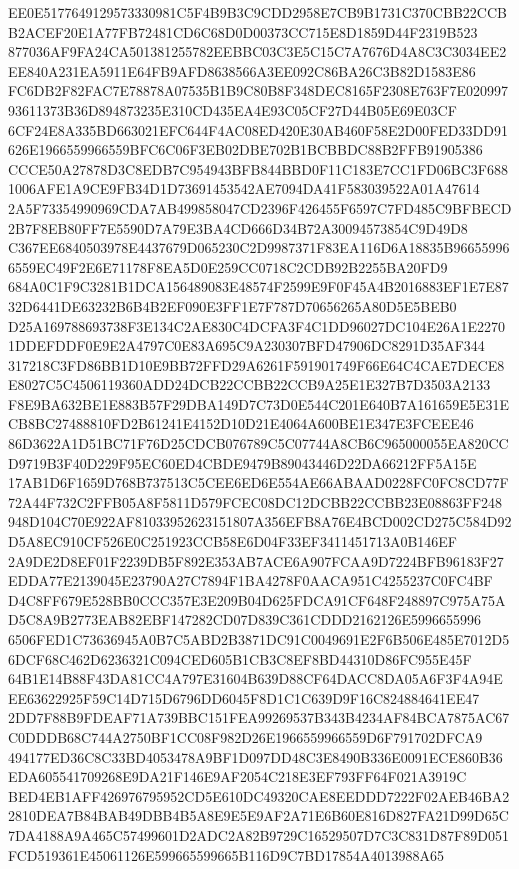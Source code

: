\documentclass[UTF8,fontset=fandol,zihao=-4,a4paper]{ctexart}
\begin{document}
{{EE0E5177649129573330981C5F4B9B3C9CDD2958E7CB9B1731C370CBB22CCBB2ACEF20E1A77FB72481CD6C68D0D00373CC715E8D1859D44F2319B523
877036AF9FA24CA501381255782EEBBC03C3E5C15C7A7676D4A8C3C3034EE2EE840A231EA5911E64FB9AFD8638566A3EE092C86BA26C3B82D1583E86
FC6DB2F82FAC7E78878A07535B1B9C80B8F348DEC8165F2308E763F7E02099793611373B36D894873235E310CD435EA4E93C05CF27D44B05E69E03CF
6CF24E8A335BD663021EFC644F4AC08ED420E30AB460F58E2D00FED33DD91626E1966559966559BFC6C06F3EB02DBE702B1BCBBDC88B2FFB91905386
CCCE50A27878D3C8EDB7C954943BFB844BBD0F11C183E7CC1FD06BC3F6881006AFE1A9CE9FB34D1D73691453542AE7094DA41F583039522A01A47614
2A5F73354990969CDA7AB499858047CD2396F426455F6597C7FD485C9BFBECD2B7F8EB80FF7E5590D7A79E3BA4CD666D34B72A30094573854C9D49D8
C367EE6840503978E4437679D065230C2D9987371F83EA116D6A18835B966559966559EC49F2E6E71178F8EA5D0E259CC0718C2CDB92B2255BA20FD9
684A0C1F9C3281B1DCA156489083E48574F2599E9F0F45A4B2016883EF1E7E8732D6441DE63232B6B4B2EF090E3FF1E7F787D70656265A80D5E5BEB0
D25A169788693738F3E134C2AE830C4DCFA3F4C1DD96027DC104E26A1E22701DDEFDDF0E9E2A4797C0E83A695C9A230307BFD47906DC8291D35AF344
317218C3FD86BB1D10E9BB72FFD29A6261F591901749F66E64C4CAE7DECE8E8027C5C4506119360ADD24DCB22CCBB22CCB9A25E1E327B7D3503A2133
F8E9BA632BE1E883B57F29DBA149D7C73D0E544C201E640B7A161659E5E31ECB8BC27488810FD2B61241E4152D10D21E4064A600BE1E347E3FCEEE46
86D3622A1D51BC71F76D25CDCB076789C5C07744A8CB6C965000055EA820CCD9719B3F40D229F95EC60ED4CBDE9479B89043446D22DA66212FF5A15E
17AB1D6F1659D768B737513C5CEE6ED6E554AE66ABAAD0228FC0FC8CD77F72A44F732C2FFB05A8F5811D579FCEC08DC12DCBB22CCBB23E08863FF248
948D104C70E922AF81033952623151807A356EFB8A76E4BCD002CD275C584D92D5A8EC910CF526E0C251923CCB58E6D04F33EF3411451713A0B146EF
2A9DE2D8EF01F2239DB5F892E353AB7ACE6A907FCAA9D7224BFB96183F27EDDA77E2139045E23790A27C7894F1BA4278F0AACA951C4255237C0FC4BF
D4C8FF679E528BB0CCC357E3E209B04D625FDCA91CF648F248897C975A75AD5C8A9B2773EAB82EBF147282CD07D839C361CDDD2162126E5996655996
6506FED1C73636945A0B7C5ABD2B3871DC91C0049691E2F6B506E485E7012D56DCF68C462D6236321C094CED605B1CB3C8EF8BD44310D86FC955E45F
64B1E14B88F43DA81CC4A797E31604B639D88CF64DACC8DA05A6F3F4A94EEE63622925F59C14D715D6796DD6045F8D1C1C639D9F16C824884641EE47
2DD7F88B9FDEAF71A739BBC151FEA99269537B343B4234AF84BCA7875AC67C0DDDB68C744A2750BF1CC08F982D26E1966559966559D6F791702DFCA9
494177ED36C8C33BD4053478A9BF1D097DD48C3E8490B336E0091ECE860B36EDA605541709268E9DA21F146E9AF2054C218E3EF793FF64F021A3919C
BED4EB1AFF426976795952CD5E610DC49320CAE8EEDDD7222F02AEB46BA22810DEA7B84BAB49DBB4B5A8E9E5E9AF2A71E6B60E816D827FA21D99D65C
7DA4188A9A465C57499601D2ADC2A82B9729C16529507D7C3C831D87F89D051FCD519361E45061126E599665599665B116D9C7BD17854A4013988A65
}}
\end{document}
